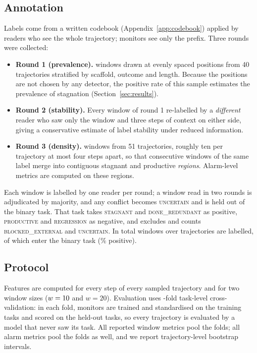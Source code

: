 \subsection{Annotation}
Labels come from a written codebook (Appendix~\ref{app:codebook}) applied by readers who see the whole
trajectory; monitors see only the prefix. Three rounds were collected:

\begin{itemize}[leftmargin=1.2em,itemsep=2pt,topsep=2pt]
\item \textbf{Round 1 (prevalence).} \pannPositionWindows{} windows drawn at evenly spaced positions from
40 trajectories stratified by scaffold, outcome and length. Because the positions are not chosen by any
detector, the positive rate of this sample estimates the prevalence of stagnation
(Section~\ref{sec:results}).
\item \textbf{Round 2 (stability).} Every window of round 1 re-labelled by a \emph{different} reader who
saw only the window and three steps of context on either side, giving a conservative estimate of label
stability under reduced information.
\item \textbf{Round 3 (density).} \pannDenseWindows{} windows from 51 trajectories, roughly ten per
trajectory at most four steps apart, so that consecutive windows of the same label merge into contiguous
stagnant and productive \emph{regions}. Alarm-level metrics are computed on these regions.
\end{itemize}

Each window is labelled by one reader per round; a window read in two rounds is adjudicated by majority,
and any conflict becomes \textsc{uncertain} and is held out of the binary task. That task takes
\textsc{stagnant} and \textsc{done\_redundant} as positive, \textsc{productive} and \textsc{regression} as
negative, and excludes and counts \textsc{blocked\_external} and \textsc{uncertain}. In total
\pannWindowsTotal{} windows over \pannTrajTotal{} trajectories are labelled, of which \pannBinaryN{} enter
the binary task (\pannPosRate{}\% positive).

\subsection{Protocol}
Features are computed for every step of every sampled trajectory and for two window sizes ($w=10$
and $w=20$). Evaluation uses \pnFolds-fold task-level cross-validation: in each fold, monitors are
trained and standardised on the training tasks and scored on the held-out tasks, so every trajectory is
evaluated by a model that never saw its task. All reported window metrics pool the folds; all alarm
metrics pool the folds as well, and we report trajectory-level bootstrap intervals.

